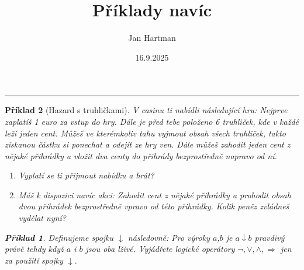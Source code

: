 \documentclass[10pt]{article}
\title{Příklady navíc}
\author{Jan Hartman}
\date{16.9.2025}
\newcommand{\titlerule}{%
    \noindent %
    \makebox[\textwidth]{\large \thetitle \hfill \thedate}
    \rule{\textwidth}{0.4pt}%
}
\theoremstyle{definitionstyle}
\theoremstyle{problemstyle}
\newtheorem{problem}{Příklad}
\begin{document}
\titlerule

\begin{problem}[Hazard s truhličkami]
V casinu ti nabídli následující hru: Nejprve zaplatíš 1 euro za vstup do hry. Dále je před tebe položeno 6 truhliček, kde v každé leží jeden cent. Můžeš ve kterémkoliv tahu vyjmout obsah všech truhliček, takto získanou částku si ponechat a odejít ze hry ven. Dále můžeš zahodit jeden cent z nějaké přihrádky a vložit dva centy do přihrády bezprostředně napravo od ní.

\begin{enumerate}[label=(\alph*)]
\item Vyplatí se ti přijmout nabídku a hrát?
\item Máš k dispozici navíc akci: Zahodit cent z nějaké přihrádky a prohodit obsah dvou přihrádek bezprostředně vpravo od této přihrádky. Kolik peněz zvládneš vydělat nyní?
\end{enumerate}

\begin{problem}
Definujeme spojku $\downarrow$ následovně: Pro výroky $a$,$b$ je $a \downarrow b$ pravdivý právě tehdy když $a$ i $b$ jsou oba lživé. Vyjádřete logické operátory $\neg, \vee, \wedge, \Rightarrow$ jen za použití spojky $\downarrow$. 
\end{problem}

\end{problem}
\end{document}
